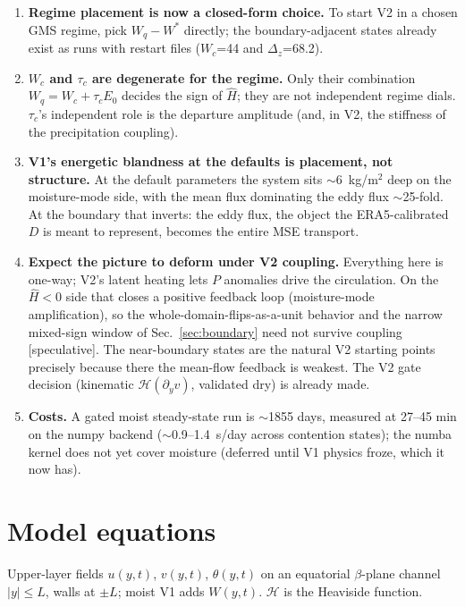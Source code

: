 \documentclass[11pt]{article}
\newcommand{\py}{\partial_y}
\newcommand{\Hhat}{\hat H}
\newcommand{\Wq}{W_q}
\newcommand{\Wstar}{W^*}
\newcommand{\Hv}{\mathcal{H}}
\begin{document}
\begin{enumerate}
\item \textbf{Regime placement is now a closed-form choice.} To start V2 in
a chosen GMS regime, pick $\Wq - \Wstar$ directly; the boundary-adjacent
states already exist as runs with restart files ($W_c$=44 and
$\Delta_z$=68.2).
\item \textbf{$W_c$ and $\tau_c$ are degenerate for the regime.} Only their
combination $\Wq = W_c + \tau_c E_0$ decides the sign of $\Hhat$; they are
not independent regime dials. $\tau_c$'s independent role is the departure
amplitude (and, in V2, the stiffness of the precipitation coupling).
\item \textbf{V1's energetic blandness at the defaults is placement, not
structure.} At the default parameters the system sits $\sim$6~kg/m$^2$ deep
on the moisture-mode side, with the mean flux dominating the eddy flux
$\sim$25-fold. At the boundary that inverts: the eddy flux, the object the
ERA5-calibrated $D$ is meant to represent, becomes the entire MSE
transport.
\item \textbf{Expect the picture to deform under V2 coupling.} Everything
here is one-way; V2's latent heating lets $P$ anomalies drive the
circulation. On the $\Hhat < 0$ side that closes a positive feedback loop
(moisture-mode amplification), so the whole-domain-flips-as-a-unit behavior
and the narrow mixed-sign window of Sec.~\ref{sec:boundary} need not
survive coupling [speculative]. The near-boundary states are the natural V2 starting points
precisely because there the mean-flow feedback is weakest. The V2 gate
decision (kinematic $\Hv(\py v)$, validated dry) is already made.
\item \textbf{Costs.} A gated moist steady-state run is $\sim$1855 days,
measured at 27--45 min on the numpy backend ($\sim$0.9--1.4~s/day across
contention states); the numba kernel does not yet cover moisture (deferred
until V1 physics froze, which it now has).
\end{enumerate}

\appendix

\section{Model equations}
\label{app:eqs}

Upper-layer fields $u(y,t)$, $v(y,t)$, $\theta(y,t)$ on an equatorial
$\beta$-plane channel $|y| \le L$, walls at $\pm L$; moist V1 adds
$W(y,t)$. $\Hv$ is the Heaviside function.
\end{document}
